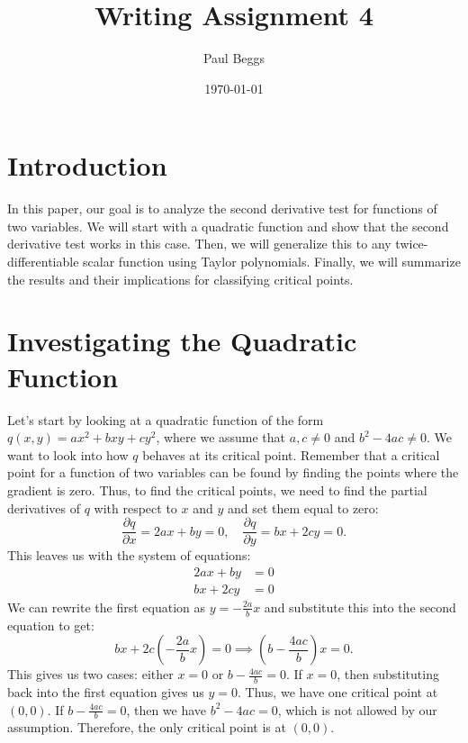 \documentclass{article}
\title{Writing Assignment 4}
\author{Paul Beggs}
\date{\today}
\begin{document}
\maketitle

\section{Introduction}

In this paper, our goal is to analyze the second derivative test for functions of two variables. We will start with a quadratic function and show that the second derivative test works in this case. Then, we will generalize this to any twice-differentiable scalar function using Taylor polynomials. Finally, we will summarize the results and their implications for classifying critical points.

\section{Investigating the Quadratic Function}

Let's start by looking at a quadratic function of the form \( q(x, y) = ax^2 + bxy + cy^2 \), where we assume that \( a, c \neq 0 \) and \(b^{2} - 4ac \ne 0\). We want to look into how \( q \) behaves at its critical point. Remember that a critical point for a function of two variables can be found by finding the points where the gradient is zero. Thus, to find the critical points, we need to find the partial derivatives of \( q \) with respect to \( x \) and \( y \) and set them equal to zero:
\[
    \frac{\partial q}{\partial x} = 2ax + by = 0, \quad \frac{\partial q}{\partial y} = bx + 2cy = 0.
\]
This leaves us with the system of equations:
\begin{align*}
    2ax + by &= 0 \\
    bx + 2cy &= 0
\end{align*}
We can rewrite the first equation as \( y = -\frac{2a}{b}x \) and substitute this into the second equation to get:
\[
    bx + 2c\left(-\frac{2a}{b}x\right) = 0 \implies \left(b - \frac{4ac}{b}\right)x = 0.
\]
This gives us two cases: either \( x = 0 \) or \( b - \frac{4ac}{b} = 0 \). If \( x = 0 \), then substituting back into the first equation gives us \( y = 0 \). Thus, we have one critical point at \( (0, 0) \). If \( b - \frac{4ac}{b} = 0 \), then we have \( b^2 - 4ac = 0 \), which is not allowed by our assumption. Therefore, the only critical point is at \( (0, 0) \). \\
\end{document}
